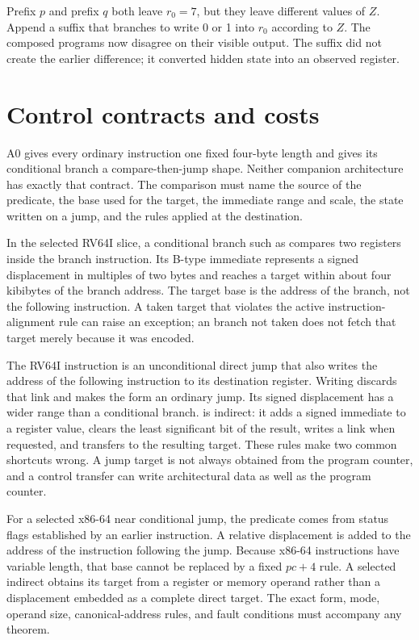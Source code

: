 \begin{example}[title={A context exposes one forgotten bit}]
Prefix \(p\) and prefix \(q\) both leave \(r_0=7\), but they leave different
values of \(Z\). Append a suffix that branches to write 0 or 1 into \(r_0\)
according to \(Z\). The composed programs now disagree on their visible
output. The suffix did not create the earlier difference; it converted hidden
state into an observed register.
\end{example}

\section{Control contracts and costs}

A0 gives every ordinary instruction one fixed four-byte length and gives its
conditional branch a compare-then-jump shape. Neither companion architecture
has exactly that contract. The comparison must name the source of the
predicate, the base used for the target, the immediate range and scale, the
state written on a jump, and the rules applied at the destination.

In the selected RV64I slice, a conditional branch such as 
compares two registers inside the branch instruction. Its B-type immediate
represents a signed displacement in multiples of two bytes and reaches a
target within about four kibibytes of the branch address. The target base is
the address of the branch, not the following instruction. A taken target that
violates the active instruction-alignment rule can raise an exception; an
branch not taken does not fetch that target merely because it was encoded.
\autocite{riscv2026unpriv}

The RV64I  instruction is an unconditional direct jump that also
writes the address of the following instruction to its destination register.
Writing  discards that link and makes the form an ordinary jump.
Its signed displacement has a wider range than a conditional branch.
 is indirect: it adds a signed immediate to a register value,
clears the least significant bit of the result, writes a link when requested,
and transfers to the resulting target. These rules make two common shortcuts
wrong. A jump target is not always obtained from the program counter, and a
control transfer can write architectural data as well as the program counter.

For a selected x86-64 near conditional jump, the predicate comes from status
flags established by an earlier instruction. A relative displacement is added
to the address of the instruction following the jump. Because x86-64
instructions have variable length, that base cannot be replaced by a fixed
\(pc+4\) rule. A selected indirect  obtains its target from a
register or memory operand rather than a displacement embedded as a complete
direct target. The exact form, mode, operand size, canonical-address rules, and
fault conditions must accompany any theorem.\autocite{intel2026sdm1,intel2026sdm2}

